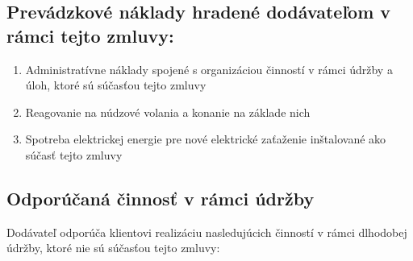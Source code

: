 \begin{center}
\end{center}

\subsection{Prevádzkové náklady hradené dodávateľom v rámci tejto zmluvy:}
\begin{enumerate}
	\item Administratívne náklady spojené s organizáciou činností v rámci údržby a úloh, ktoré sú súčasťou tejto zmluvy
	\item Reagovanie na núdzové volania a konanie na základe nich
	\item Spotreba elektrickej energie pre nové elektrické zaťaženie inštalované ako súčasť tejto zmluvy
\end{enumerate}


\subsection{Odporúčaná činnosť v rámci údržby}

Dodávateľ odporúča klientovi realizáciu nasledujúcich činností v rámci dlhodobej údržby, ktoré nie sú súčasťou tejto zmluvy:


\begin{center}
\end{center}
